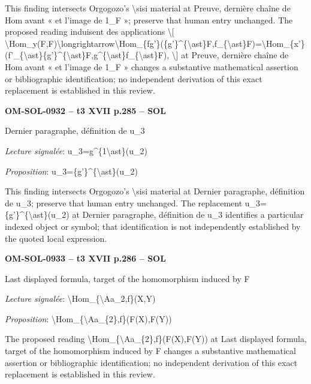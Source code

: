 This finding intersects Orgogozo's \textbackslash{}sisi material at Preuve, dernière chaîne de Hom avant « et l'image de 1\_F »; preserve that human entry unchanged. The proposed reading induisent des applications \textbackslash{}[ \textbackslash{}Hom\_y(F,F)\textbackslash{}longrightarrow\textbackslash{}Hom\_\{fg'\}(\{g'\}\textasciicircum{}\{\textbackslash{}ast\}F,f\_\{\textbackslash{}ast\}F)=\allowbreak \textbackslash{}Hom\_\{x'\}(f'\_\{\textbackslash{}ast\}\{g'\}\textasciicircum{}\{\textbackslash{}ast\}F,g\textasciicircum{}\{\textbackslash{}ast\}f\_\{\textbackslash{}ast\}F), \textbackslash{}] at Preuve, dernière chaîne de Hom avant « et l'image de 1\_F » changes a substantive mathematical assertion or bibliographic identification; no independent derivation of this exact replacement is established in this review.\par
\par\noindent\textbf{OM-SOL-0932 -- t3 XVII p.285 -- SOL}\par
Dernier paragraphe, définition de u\_3\par
\emph{Lecture signalée}: u\_3=\allowbreak g\textasciicircum{}\{1\textbackslash{}ast\}(u\_2)\par
\emph{Proposition}: u\_3=\allowbreak \{g'\}\textasciicircum{}\{\textbackslash{}ast\}(u\_2)\par
This finding intersects Orgogozo's \textbackslash{}sisi material at Dernier paragraphe, définition de u\_3; preserve that human entry unchanged. The replacement u\_3=\allowbreak \{g'\}\textasciicircum{}\{\textbackslash{}ast\}(u\_2) at Dernier paragraphe, définition de u\_3 identifies a particular indexed object or symbol; that identification is not independently established by the quoted local expression.\par
\par\noindent\textbf{OM-SOL-0933 -- t3 XVII p.286 -- SOL}\par
Last displayed formula, target of the homomorphism induced by F\par
\emph{Lecture signalée}: \textbackslash{}Hom\_\{\textbackslash{}Aa\_2,f\}(X,Y)\par
\emph{Proposition}: \textbackslash{}Hom\_\{\textbackslash{}Aa\_\{2\},f\}(F(X),F(Y))\par
The proposed reading \textbackslash{}Hom\_\{\textbackslash{}Aa\_\{2\},f\}(F(X),F(Y)) at Last displayed formula, target of the homomorphism induced by F changes a substantive mathematical assertion or bibliographic identification; no independent derivation of this exact replacement is established in this review.\par
